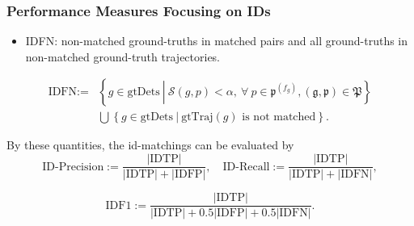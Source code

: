 \documentclass[slidetop, mathserif]{beamer}
\begin{document}
\begin{frame}
	\frametitle{Performance Measures Focusing on IDs}
	\begin{itemize}
		\item IDFN:
		      non-matched ground-truths in matched pairs and
		      all ground-truths in non-matched ground-truth trajectories.
	\end{itemize}

	\vspace{-15pt}
	\begin{align*}
		\text{IDFN} := & \left\{ g\in\text{gtDets}\ \left|\                                                
		\mathcal S(g,p)<\alpha, \ 
		\forall\ p\in\mathfrak p^{(f_g)},
		(\mathfrak g,\mathfrak p)\in\mathfrak P
		\right.
		\right\} \\
		               & \bigcup \left\{g \in \text{gtDets}\ |\ \text{gtTraj$(g)$ is not matched}\right\}. 
	\end{align*}
	
	By these quantities, the id-matchings can be evaluated by
	\[
		\text{ID-Precision} := \dfrac{|\text{IDTP}|}{|\text{IDTP}| + |\text{IDFP}|},
		\quad
		\text{ID-Recall} := \dfrac{|\text{IDTP}|}{|\text{IDTP}| + |\text{IDFN}|},
	\]

	\vspace{-10pt}
	\[
		\text{IDF1} := \dfrac{|\text{IDTP}|}{|\text{IDTP}| + 0.5|\text{IDFP}| + 0.5|\text{IDFN}|}.
	\]
\end{frame}
\end{document}
